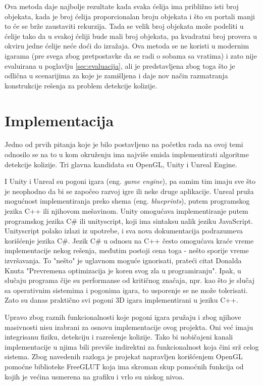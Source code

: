 \documentclass[12pt,oneside]{memoir}
\begin{document}
Ova metoda daje najbolje rezultate kada svaka ćelija ima približno isti broj objekata, kada je 
broj ćelija proporcionalan broju objekata i što su portali manji to će se brže zaustaviti rekurzija.
Tada se velik broj objekata može podeliti u ćelije tako da u svakoj ćeliji bude mali broj objekata,
pa kvadratni broj provera u okviru jedne ćelije neće doći do izražaja.
Ova metoda se ne koristi u modernim igarama (pre svega zbog pretpostavke da se radi o sobama sa vratima) i zato nije evaluirana u poglavlju \ref{sec:evaluacija},
ali je predstavljena zbog toga što je odlična u scenarijima za
koje je zamišljena i daje nov način razmatranja konstrukcije rešenja za problem detekcije kolizije.

\chapter{Implementacija}
\label{sec:implementacija}

Jedno od prvih pitanja koje je bilo postavljeno na početku rada na ovoj temi odnosilo se na to 
u kom okruženju ima najviše smisla implementirati algoritme detekcije kolizije.
Tri glavna kandidata su OpenGL, Unity i Unreal Engine.

I Unity i Unreal su pogoni igara (eng. {\em game engine}), pa samim tim imaju sve što je neophodno da 
bi se započeo razvoj igre ili neke druge aplikacije.
Unreal pruža mogućnost implementiranja preko shema (eng. {\em blueprints}),
putem programskog jezika C++ ili njihovom mešavinom.
Unity omogućava implementiranje putem programskog jezika C\# ili unityscript,
koji ima sintaksu nalik jeziku JavaScript. Unityscript polako izlazi iz upotrebe, i 
sva nova dokumentacija podrazumeva korišćenje jezika C\#.
Jezik C\# u odnosu na C++ često omogućava kraće vreme implementacije nekog rešenja,
međutim postoji cena toga - nešto sporije vreme izvršavanja.
To "nešto" je uglavnom moguće ignorisati, prateći citat Donalda Knuta 
"Prevremena optimizacija je koren svog zla u programiranju".
Ipak, u slučaju programa čije su performanse od kritičnog značaja, npr. kao što je 
slučaj sa operativnim sistemima i pogonima igara, to usporenje se ne može tolerisati.
Zato su danas praktično svi pogoni 3D igara implementirani u jeziku C++.

Upravo zbog raznih funkcionalnosti koje pogoni igara pružaju i zbog njihove masivnosti nisu izabrani
za osnovu implementacije ovog projekta. Oni već imaju integrisanu fiziku, detekciju 
i razrešenje kolizije. Tako bi uobičajeni kanali implementacije u njima 
bili previše indirektni za funkcionalnost koja čini srž celog sistema.
Zbog navedenih razloga je projekat napravljen korišćenjem OpenGL pomoćne 
biblioteke FreeGLUT  koja ima skroman skup pomoćnih
funkcija od kojih je većina usmerena na grafiku i vrlo su niskog nivoa.
\end{document}

